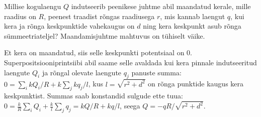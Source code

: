 \setAuthor{}

Millise kogulaengu $Q$ indutseerib peenikese juhtme abil maandatud kerale, mille raadius on $R$, peenest traadist rõngas raadiusega $r$, mis kannab laengut $q$, kui kera ja rõnga keskpunktide vahekaugus on $d$ ning kera keskpunkt asub rõnga sümmeetriateljel? Maandamisjuhtme mahtuvus on tühiselt väike. 

\hint

\solu
Et kera on maandatud, siis selle keskpunkti potentsiaal on 0. Superpositsiooniprintsiibi abil saame selle avaldada kui kera pinnale indutseeritud laengute $Q_i$ ja rõngal olevate laengute $q_j$ panuste summa: $0=\sum_i kQ_i/R+k\sum_jkq_j/l$, kus $l=\sqrt{r^2+d^2}$ on rõnga punktide kaugus kera keskpunktist. Summas saab konstandid sulgude ette tuua: $0=\frac kR \sum_iQ_i+\frac kl\sum_jq_j=kQ/R+kq/l$, seega $Q=-qR/\sqrt{r^2+d^2}$.
\probend